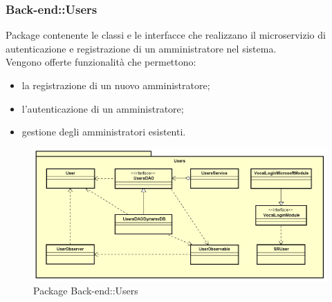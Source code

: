 \subsubsection{Back-end::Users}
Package contenente le classi e le interfacce che realizzano il microservizio di autenticazione e registrazione di un amministratore nel sistema.\\
Vengono offerte funzionalità che permettono:
\begin{itemize}
\item la registrazione di un nuovo amministratore;
\item l'autenticazione di un amministratore;
\item gestione degli amministratori esistenti.
\end{itemize}
\begin{figure}[h] \centering \includegraphics[width=\textwidth,height=\textheight,keepaspectratio]{images/diagrams/back-end/Official_Backend_0304/Users.png}
	\caption{Package Back-end::Users}
\end{figure}
\newpage

